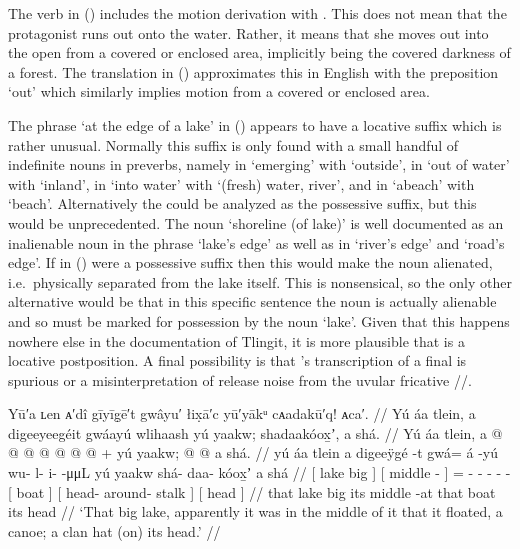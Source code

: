 The verb in (\lastx) includes the motion derivation with .
This does not mean that the protagonist runs out onto the water.
Rather, it means that she moves out into the open from a covered or enclosed area, implicitly being the covered darkness of a forest.
The translation in (\lastx) approximates this in English with the preposition ‘out’ which similarly implies motion from a covered or enclosed area.

The phrase  ‘at the edge of a lake’ in (\lastx) appears to have a locative  suffix which is rather unusual.
Normally this suffix is only found with a small handful of indefinite nouns in preverbs, namely in  ‘emerging’ with  ‘outside’, in  ‘out of water’ with  ‘inland’, in  ‘into water’ with  ‘(fresh) water, river’, and in  ‘abeach’ with  ‘beach’.
Alternatively the  could be analyzed as the possessive suffix, but this would be unprecedented.
The noun  ‘shoreline (of lake)’ is well documented as an inalienable noun in the phrase  ‘lake’s edge’ as well as in  ‘river’s edge’ and  ‘road’s edge’.
If  in (\lastx) were a possessive suffix then this would make the noun  alienated, i.e.\ physically separated from the lake itself.
This is nonsensical, so the only other alternative would be that in this specific sentence the noun  is actually alienable and so must be marked for possession by the noun  ‘lake’.
Given that this happens nowhere else in the documentation of Tlingit, it is more plausible that  is a locative postposition.
A final possibility is that \citeauthor{swanton:1909}’s transcription of a final  is spurious or a misinterpretation of release noise from the uvular fricative //.

\ex\label{ex:89-47-boat-floats-in-lake}%
%
\begingl
	\glpreamble	Yū′a ʟen ᴀ′dî gīyīg̣ē′t gwâyu′ łix̣ā′c yū′yākᵘ cᴀadakū′q! ᴀca′. //
	\glpreamble	Yú áa tlein, a digeeyeegéit gwáayú wlihaash yú yaakw; shadaakóox̱ʼ, a shá. //
	\gla	{} Yú áa tlein, {} 
		{} a  @ {} {}
		 @ {} @ {} 
		 @ {} @ {} @ {} @ {} +
		{} yú yaakw; {}
		{}  @ {} @ {} {}
		{} a shá. {} //
	\glb	{} yú áa tlein {}
		{} a digeeÿgé -t {}
		gwá= á -yú
		wu- l- i-  -μμL
		{} yú yaakw {}
		{} shá- daa- kóox̱ʼ {}
		{} a shá {} //
	\glc	{}[  lake big {}]
		{}[  middle - {}]
		=  -
		- - -  -
		{}[  boat {}]
		{}[ head- around- stalk {}]
		{}[  head {}] //
	\gld	{} that lake big {}
		{} its middle -at {}
		 {} {}
		 {} {} {} {}
		{} that boat {}
		{}  {} {} {}
		{} its head {} //
	\glft	‘That big lake, apparently it was in the middle of it that it floated, a canoe; a clan hat (on) its head.’
		//
\endgl
\xe

